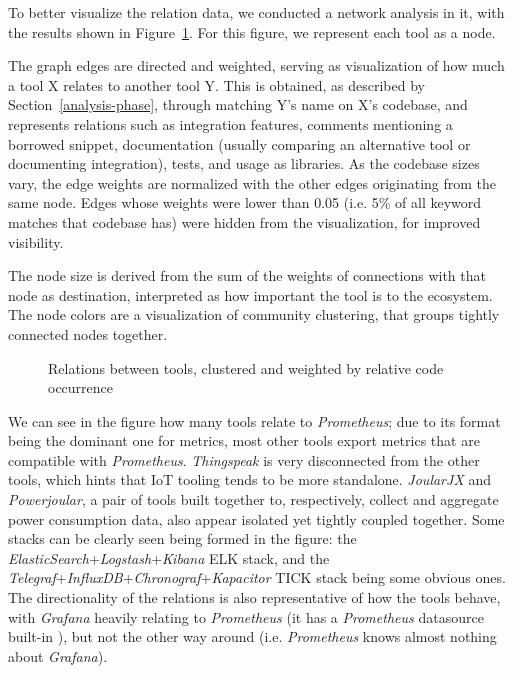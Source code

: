 \documentclass[sigconf]{acmart}
\begin{document}
To better visualize the relation data, we conducted a network analysis in
it, with the results shown in Figure~\ref{fig-relations}. For this figure,
we represent each tool as a node.

The graph edges are directed and weighted, serving as visualization of how
much a tool X relates to another tool Y. This is obtained, as described by
Section~\ref{analysis-phase}, through matching Y's name on X's codebase,
and represents relations such as integration features, comments mentioning
a borrowed snippet, documentation (usually comparing an alternative tool or
documenting integration), tests, and usage as libraries. As the codebase sizes
vary, the edge weights are normalized with the other edges originating from the
same node. Edges whose weights were lower than 0.05 (i.e. 5\% of all keyword
matches that codebase has) were hidden from the visualization, for improved
visibility.

The node size is derived from the sum of the weights of connections with that
node as destination, interpreted as how important the tool is to the
ecosystem. The node colors are a visualization of community clustering, that
groups tightly connected nodes together.

\begin{figure}[!htbp]
  \centering
  
  \caption{Relations between tools, clustered and weighted by relative code occurrence}
  \label{fig-relations}
\end{figure}

We can see in the figure how many tools relate to
\emph{Prometheus}; due to its format being the dominant one for metrics,
most other tools export metrics that are compatible with
\emph{Prometheus}. \emph{Thingspeak} is very disconnected from the other
tools, which hints that IoT tooling tends to be more standalone.
\emph{JoularJX} and \emph{Powerjoular}, a pair of tools built together
to, respectively, collect and aggregate power consumption data, also
appear isolated yet tightly coupled together. Some stacks can be
clearly seen being formed in the figure: the
\emph{ElasticSearch}+\emph{Logstash}+\emph{Kibana} ELK stack, and the
\emph{Telegraf}+\emph{InfluxDB}+\emph{Chronograf}+\emph{Kapacitor} TICK
stack being some obvious ones. The directionality of the relations is
also representative of how the tools behave, with \emph{Grafana} heavily
relating to \emph{Prometheus} (it has a \emph{Prometheus} datasource
built-in \cite{grafana-prometheus-docs}), but not the other way
around (i.e. \emph{Prometheus} knows almost nothing about
\emph{Grafana}).
\end{document}
